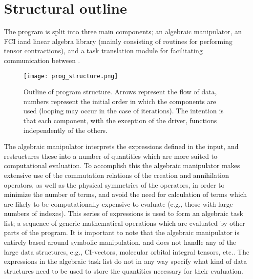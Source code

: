 \section{Structural outline}
\noindent The program is split into three main components; an algebraic manipulator, an FCI
iand linear algebra library (mainly consisting of routines for performing tensor contractions),
and a task translation module for facilitating communication between .\\

\begin{figure}[!ht]
\begin{center}
\texttt{[image: prog\_structure.png]}
\caption{ Outline of program structure. Arrows represent the flow of data, numbers represent the
initial order in which the components are used (looping may occur in the case of iterations).
The intention is that each component, with the exception of the driver, functions independently of the others.}
\end{center}
\label{fig:prog_structure}
\end{figure}

\noindent The algebraic manipulator interprets the expressions defined
in the input, and restructures these into a number of quantities which are
more suited to computational evaluation. To accomplish this the
algebraic manipulator makes extensive use of the commutation
relations of the creation and annihilation operators, as well as the physical
symmetries of the operators, in order to minimize the number of terms, and
avoid the need for calculation of terms which are likely to be computationally
expensive to evaluate (e.g., those with large numbers of indexes). This series
of expressions is used to form an algebraic task list; a sequence of
generic mathematical operations which are evaluated by other parts of the program.
It is important to note that the algebraic manipulator is entirely based around symbolic manipulation,
and does not handle any of the large data structures, e.g., CI-vectors,
molecular orbital integral tensors, etc.. The expressions in the algebraic
task list do not in any way specify what kind of data structures need to
be used to store the quantities necessary for their evaluation.\\

